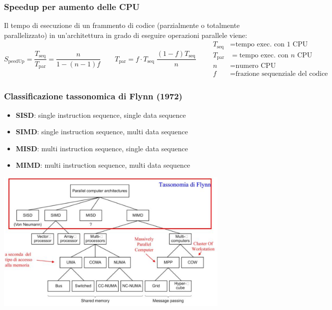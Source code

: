 \documentclass[a4paper]{article}
\begin{document}
\subsubsection*{Speedup per aumento delle CPU}
Il tempo di esecuzione di un frammento di codice (parzialmente o totalmente parallelizzato) in un'architettura in grado di eseguire
operazioni parallele viene:
\[S_\text{peedUp} = \frac{T_\text{seq}}{T_\text{par}} = \frac{n}{1- (n-1)f} \qquad T_\text{par} = f \cdot T_\text{seq} \; \frac{(1-f)T_\text{seq}}{n} \qquad
\begin{aligned}
T_\text{seq} &= \text{tempo exec. con 1 CPU} \\
T_\text{par} &= \text{tempo exec. con } n \text{ CPU} \\
n &= \text{numero CPU} \\
f &= \text{frazione sequenziale del codice}
\end{aligned}\]

\subsubsection*{Classificazione tassonomica di Flynn (1972)}
\begin{center}
	\begin{minipage}{0.39\textwidth}
		\begin{itemize}
			\item \textbf{SISD}: single instruction sequence, single data sequence
			\item \textbf{SIMD}: single instruction sequence, multi data sequence
			\item \textbf{MISD}: multi instruction sequence, single data sequence
			\item \textbf{MIMD}: multi instruction sequence, multi data sequence
		\end{itemize}
	\end{minipage}
	\begin{minipage}{0.6\textwidth}
		\centering
		\includegraphics[width=0.85\textwidth]{architetture parallele.png}
	\end{minipage}
\end{center}
\end{document}
